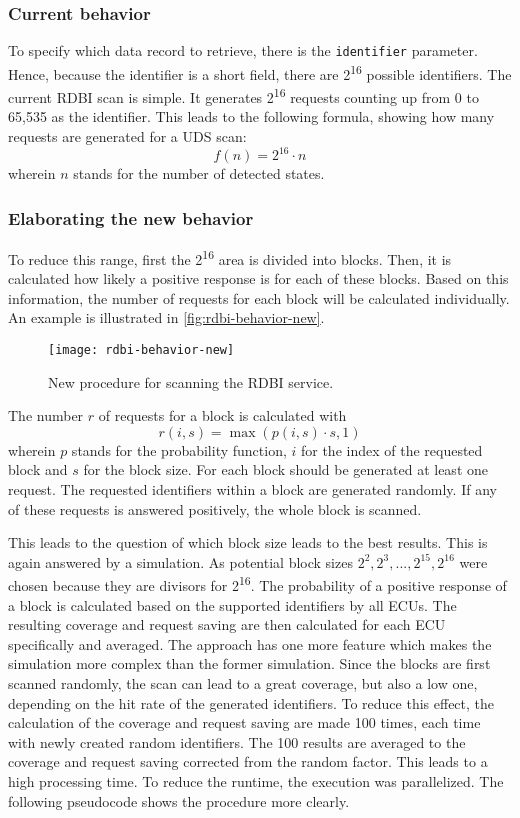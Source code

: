 \subsubsection{Current behavior}

To specify which data record to retrieve, there is the \texttt{identifier} parameter. Hence, because the identifier is a short field, there are 2\textsuperscript{16} possible identifiers.
The current RDBI scan is simple. It generates 2\textsuperscript{16} requests counting up from 0 to 65,535 as the identifier. This leads to the following formula, showing how many requests are generated for a UDS scan:
\[f(n)=2^{16} \cdot n\]
wherein $n$ stands for the number of detected states. 

\subsubsection{Elaborating the new behavior}
\label{subsubsec:rdbi-behavior}

To reduce this range, first the 2\textsuperscript{16} area is divided into blocks. Then, it is calculated how likely a positive response is for each of these blocks. Based on this information, the number of requests for each block will be calculated individually. An example is illustrated in \autoref{fig:rdbi-behavior-new}.

\begin{figure}[h]
    \centering
    \texttt{[image: rdbi-behavior-new]}
    \caption{New procedure for scanning the RDBI service.}
    \label{fig:rdbi-behavior-new}
\end{figure}

The number $r$ of requests for a block is calculated with
\[r(i, s)=\max(p(i, s) \cdot s, 1)\]
wherein $p$ stands for the probability function, $i$ for the index of the requested block and $s$ for the block size. For each block should be generated at least one request. The requested identifiers within a block are generated randomly. If any of these requests is answered positively, the whole block is scanned.

This leads to the question of which block size leads to the best results. This is again answered by a simulation. As potential block sizes $2^2, 2^3, ..., 2^{15}, 2^{16}$ were chosen because they are divisors for 2\textsuperscript{16}. The probability of a positive response of a block is calculated based on the supported identifiers by all ECUs. The resulting coverage and request saving are then calculated for each ECU specifically and averaged. The approach has one more feature which makes the simulation more complex than the former simulation. Since the blocks are first scanned randomly, the scan can lead to a great coverage, but also a low one, depending on the hit rate of the generated identifiers. To reduce this effect, the calculation of the coverage and request saving are made 100 times, each time with newly created random identifiers. The 100 results are averaged to the coverage and request saving corrected from the random factor. This leads to a high processing time. To reduce the runtime, the execution was parallelized.
The following pseudocode shows the procedure more clearly.

